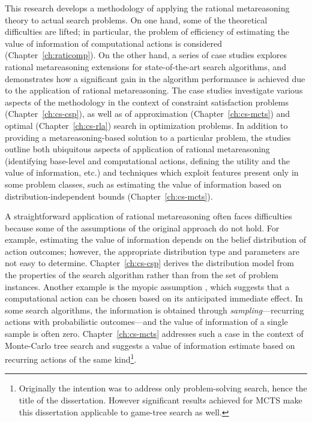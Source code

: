 This research develops a methodology of applying the rational
metareasoning theory to actual search problems.  On one hand, some
of the theoretical difficulties are lifted; in particular, the problem
of efficiency of estimating the value of information of computational
actions is considered (Chapter~\ref{ch:raticomp}). On the other hand,
a series of case studies explores rational metareasoning extensions
for state-of-the-art search algorithms, and demonstrates how a
significant gain in the algorithm performance is achieved due to the
application of rational metareasoning. The case studies investigate
various aspects of the methodology in the context of constraint satisfaction
problems (Chapter~\ref{ch:cs-csp}), as well as of approximation
(Chapter~\ref{ch:cs-mcts}) and optimal (Chapter~\ref{ch:cs-rla})
search in optimization problems. In addition to providing a
metareasoning-based solution to a particular problem, the studies
outline both ubiquitous aspects of application of rational metareasoning
(identifying base-level and computational actions, defining the
utility and the value of information, etc.)  and techniques which
exploit features present only in some problem classes, such as
estimating the value of information based on distribution-independent
bounds (Chapter~\ref{ch:cs-mcts}).

A straightforward application of rational metareasoning often faces
difficulties because some of the assumptions of the original approach do not
hold. For example, estimating the value of information depends on
the belief distribution of action outcomes; however, the appropriate
distribution type and parameters are not easy to determine. Chapter~\ref{ch:cs-csp}
derives the distribution model from the properties of the search
algorithm rather than from the set of problem instances. Another
example is the myopic assumption \cite{Russell.right}, which suggests
that a computational action can be chosen based on its anticipated immediate
effect. In some search algorithms, the information is obtained through
\emph{sampling}---recurring actions with probabilistic outcomes---and
the value of information of a single sample is often
zero. Chapter~\ref{ch:cs-mcts} addresses such a case in the context
of Monte-Carlo tree search and suggests a value of information
estimate based on recurring actions of the same kind\footnote{Originally the intention was to address only problem-solving search,
hence the title of the dissertation. However significant results
achieved for MCTS make this dissertation applicable to game-tree search as well.}.

